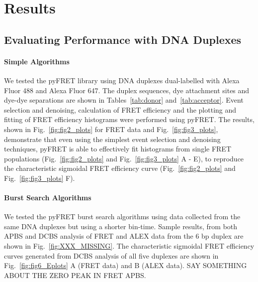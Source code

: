 \documentclass[10pt]{article}
\begin{document}


\section*{Results}

\subsection*{Evaluating Performance with DNA Duplexes}
\paragraph{Simple Algorithms}
We tested the pyFRET library using DNA duplexes dual-labelled with Alexa Fluor 488 and Alexa Fluor 647. The duplex sequences, dye attachment sites and dye-dye separations are shown in Tables~\ref{tab:donor} and~\ref{tab:acceptor}. Event selection and denoising, calculation of FRET efficiency and the plotting and fitting of FRET efficiency histograms were performed using pyFRET. The results, shown in Fig.~\ref{fig:fig2_plots} for FRET data and Fig.~\ref{fig:fig3_plots}, demonstrate that even using the simplest event selection and denoising techniques, pyFRET is able to effectively fit histograms from single FRET populations (Fig.~\ref{fig:fig2_plots} and Fig.~\ref{fig:fig3_plots} A - E), to reproduce the characteristic sigmoidal FRET efficiency curve (Fig.~\ref{fig:fig2_plots} and Fig.~\ref{fig:fig3_plots} F).

\paragraph{Burst Search Algorithms}
We tested the pyFRET burst search algorithms using data collected from the same DNA duplexes but using a shorter bin-time. Sample results, from both APBS and DCBS analysis of FRET and ALEX data from the 6 bp duplex are shown in Fig.~\ref{fig:XXX_MISSING}. The characteristic sigmoidal FRET efficiency curves generated from DCBS analysis of all five duplexes are shown in Fig.~\ref{fig:fig6_Eplots} A (FRET data) and B (ALEX data).  SAY SOMETHING ABOUT THE ZERO PEAK IN FRET APBS.
\end{document}
